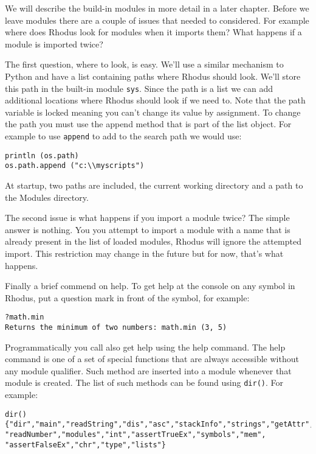 We will describe the build-in modules in more detail in a later chapter. Before we leave modules there are a couple of issues that needed to considered. For example where does Rhodus look for modules when it imports them? What happens if a module is imported twice?

The first question, where to look, is easy. We'll use a similar mechanism to Python and have a list containing paths where Rhodus should look. We'll store this path in the built-in module {\tt sys}. Since the path is a list we can add additional locations where Rhodus should look if we need to. Note that the path variable is locked meaning you can't change its value by assignment. To change the path you must use the append method that is part of the list object. For example to use {\tt append} to add to the search path we would use:

\begin{lstlisting}
println (os.path)
os.path.append ("c:\\myscripts")
\end{lstlisting}

At startup, two paths are included, the current working directory and a path to the Modules directory.

The second issue is what happens if you import a module twice? The simple answer is nothing. You you attempt to import a module with a name that is already present in the list of loaded modules, Rhodus will ignore the attempted import. This restriction may change in the future but for now, that's what happens.

Finally a brief commend on help. To get help at the console on any symbol in Rhodus, put a question mark in front of the symbol, for example:

\begin{lstlisting}
?math.min
Returns the minimum of two numbers: math.min (3, 5)
\end{lstlisting}

Programmatically you call also get help using the help command. The help command is one of a set of special functions that are always accessible without any module qualifier. Such method are inserted into a module whenever that module is created. The list of such methods can be found using {\tt dir()}. For example:

\begin{lstlisting}
dir()
{"dir","main","readString","dis","asc","stackInfo","strings","getAttr","os",
"readNumber","modules","int","assertTrueEx","symbols","mem",
"assertFalseEx","chr","type","lists"}
\end{lstlisting}

